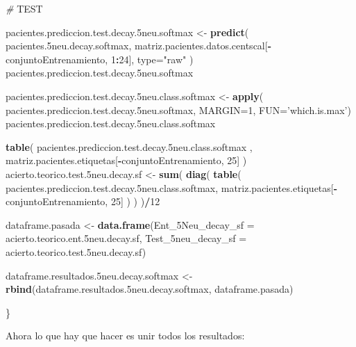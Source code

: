 \documentclass[]{article}
\newenvironment{Shaded}{\begin{snugshade}}{\end{snugshade}}
\newcommand{\KeywordTok}[1]{\textcolor[rgb]{0.13,0.29,0.53}{\textbf{#1}}}
\newcommand{\DataTypeTok}[1]{\textcolor[rgb]{0.13,0.29,0.53}{#1}}
\newcommand{\DecValTok}[1]{\textcolor[rgb]{0.00,0.00,0.81}{#1}}
\newcommand{\StringTok}[1]{\textcolor[rgb]{0.31,0.60,0.02}{#1}}
\newcommand{\CommentTok}[1]{\textcolor[rgb]{0.56,0.35,0.01}{\textit{#1}}}
\newcommand{\OperatorTok}[1]{\textcolor[rgb]{0.81,0.36,0.00}{\textbf{#1}}}
\newcommand{\AlertTok}[1]{\textcolor[rgb]{0.94,0.16,0.16}{#1}}
\newcommand{\NormalTok}[1]{#1}
\begin{document}
\begin{Shaded}
\begin{Highlighting}[]
  \CommentTok{# }\AlertTok{TEST}
  
\NormalTok{  pacientes.prediccion.test.decay.5neu.softmax <-}\StringTok{ }\KeywordTok{predict}\NormalTok{( pacientes.5neu.decay.softmax, matriz.pacientes.datos.centscal[}\OperatorTok{-}\NormalTok{conjuntoEntrenamiento, }\DecValTok{1}\OperatorTok{:}\DecValTok{24}\NormalTok{], }\DataTypeTok{type=}\StringTok{"raw"}\NormalTok{ )}
\NormalTok{  pacientes.prediccion.test.decay.5neu.softmax}
  
\NormalTok{  pacientes.prediccion.test.decay.5neu.class.softmax <-}\StringTok{ }\KeywordTok{apply}\NormalTok{( pacientes.prediccion.test.decay.5neu.softmax, }\DataTypeTok{MARGIN=}\DecValTok{1}\NormalTok{, }\DataTypeTok{FUN=}\StringTok{'which.is.max'}\NormalTok{)}
\NormalTok{  pacientes.prediccion.test.decay.5neu.class.softmax}
  
  \KeywordTok{table}\NormalTok{( pacientes.prediccion.test.decay.5neu.class.softmax , matriz.pacientes.etiquetas[}\OperatorTok{-}\NormalTok{conjuntoEntrenamiento, }\DecValTok{25}\NormalTok{] )}
\NormalTok{  acierto.teorico.test.5neu.decay.sf <-}\StringTok{ }\KeywordTok{sum}\NormalTok{( }\KeywordTok{diag}\NormalTok{( }\KeywordTok{table}\NormalTok{( pacientes.prediccion.test.decay.5neu.class.softmax, matriz.pacientes.etiquetas[}\OperatorTok{-}\NormalTok{conjuntoEntrenamiento, }\DecValTok{25}\NormalTok{] ) ) )}\OperatorTok{/}\DecValTok{12}
  
  
\NormalTok{  dataframe.pasada <-}\StringTok{ }\KeywordTok{data.frame}\NormalTok{(}\DataTypeTok{Ent_5Neu_decay_sf =}\NormalTok{ acierto.teorico.ent.5neu.decay.sf,}
                                 \DataTypeTok{Test_5neu_decay_sf =}\NormalTok{ acierto.teorico.test.5neu.decay.sf)}
  
\NormalTok{  dataframe.resultados.5neu.decay.softmax <-}\StringTok{ }\KeywordTok{rbind}\NormalTok{(dataframe.resultados.5neu.decay.softmax, dataframe.pasada)}
  
\NormalTok{\}}
\end{Highlighting}
\end{Shaded}

Ahora lo que hay que hacer es unir todos los resultados:
\end{document}
